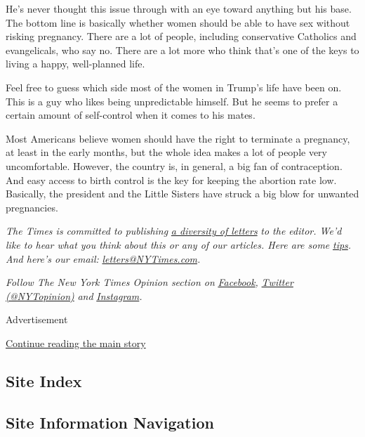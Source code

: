 He's never thought this issue through with an eye toward anything but
his base. The bottom line is basically whether women should be able to
have sex without risking pregnancy. There are a lot of people, including
conservative Catholics and evangelicals, who say no. There are a lot
more who think that's one of the keys to living a happy, well-planned
life.

Feel free to guess which side most of the women in Trump's life have
been on. This is a guy who likes being unpredictable himself. But he
seems to prefer a certain amount of self-control when it comes to his
mates.

Most Americans believe women should have the right to terminate a
pregnancy, at least in the early months, but the whole idea makes a lot
of people very uncomfortable. However, the country is, in general, a big
fan of contraception. And easy access to birth control is the key for
keeping the abortion rate low. Basically, the president and the Little
Sisters have struck a big blow for unwanted pregnancies.

\emph{The Times is committed to publishing}
\href{https://www.nytimes3xbfgragh.onion/2019/01/31/opinion/letters/letters-to-editor-new-york-times-women.html}{\emph{a
diversity of letters}} \emph{to the editor. We'd like to hear what you
think about this or any of our articles. Here are some}
\href{https://help.nytimes3xbfgragh.onion/hc/en-us/articles/115014925288-How-to-submit-a-letter-to-the-editor}{\emph{tips}}\emph{.
And here's our email:}
\href{mailto:letters@NYTimes.com}{\emph{letters@NYTimes.com}}\emph{.}

\emph{Follow The New York Times Opinion section on}
\href{https://www.facebookcorewwwi.onion/nytopinion}{\emph{Facebook}}\emph{,}
\href{http://twitter.com/NYTOpinion}{\emph{Twitter (@NYTopinion)}}
\emph{and}
\href{https://www.instagram.com/nytopinion/}{\emph{Instagram}}\emph{.}

Advertisement

\protect\hyperlink{after-bottom}{Continue reading the main story}

\hypertarget{site-index}{%
\subsection{Site Index}\label{site-index}}

\hypertarget{site-information-navigation}{%
\subsection{Site Information
Navigation}\label{site-information-navigation}}

